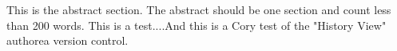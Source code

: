 This is the abstract section. The abstract should be one section and count less than 200 words. This is a test....And this is a Cory test of the "History View" authorea version control.
